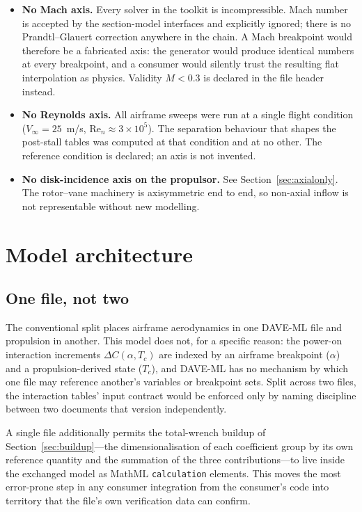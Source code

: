 \documentclass[11pt,a4paper]{article}
\begin{document}
\begin{itemize}
\item \textbf{No Mach axis.} Every solver in the toolkit is
incompressible. Mach number is accepted by the section-model interfaces
and explicitly ignored; there is no Prandtl--Glauert correction anywhere
in the chain. A Mach breakpoint would therefore be a fabricated axis: the
generator would produce identical numbers at every breakpoint, and a
consumer would silently trust the resulting flat interpolation as
physics. Validity $M < 0.3$ is declared in the file header instead.
\item \textbf{No Reynolds axis.} All airframe sweeps were run at a single
flight condition ($V_\infty = 25$~m/s, $\mathrm{Re}_n \approx
3\times10^5$). The separation behaviour that shapes the post-stall tables
was computed at that condition and at no other. The reference condition
is declared; an axis is not invented.
\item \textbf{No disk-incidence axis on the propulsor.} See
Section~\ref{sec:axialonly}. The rotor--vane machinery is axisymmetric
end to end, so non-axial inflow is not representable without new
modelling.
\end{itemize}

\section{Model architecture}

\subsection{One file, not two}

The conventional split places airframe aerodynamics in one DAVE-ML file
and propulsion in another. This model does not, for a specific reason:
the power-on interaction increments $\Delta C(\alpha, T_c)$ are indexed
by an airframe breakpoint ($\alpha$) and a propulsion-derived state
($T_c$), and DAVE-ML has no mechanism by which one file may reference
another's variables or breakpoint sets. Split across two files, the
interaction tables' input contract would be enforced only by naming
discipline between two documents that version independently.

A single file additionally permits the total-wrench buildup of
Section~\ref{sec:buildup}---the dimensionalisation of each coefficient
group by its own reference quantity and the summation of the three
contributions---to live inside the exchanged model as MathML
\texttt{calculation} elements. This moves the most error-prone step in
any consumer integration from the consumer's code into territory that the
file's own verification data can confirm.
\end{document}
